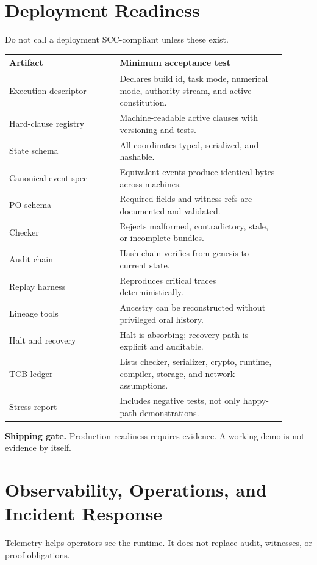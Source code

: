 \documentclass[11pt,oneside]{article}
\newenvironment{shipbox}{\begin{shaded}\noindent\textbf{Shipping gate.} }{\end{shaded}}
\begin{document}
\section{Deployment Readiness}
Do not call a deployment SCC-compliant unless these exist.

\begin{longtable}{@{}p{0.36\linewidth}p{0.54\linewidth}@{}}
\toprule
\textbf{Artifact} & \textbf{Minimum acceptance test} \\
\midrule
Execution descriptor & Declares build id, task mode, numerical mode, authority stream, and active constitution. \\
Hard-clause registry & Machine-readable active clauses with versioning and tests. \\
State schema & All coordinates typed, serialized, and hashable. \\
Canonical event spec & Equivalent events produce identical bytes across machines. \\
PO schema & Required fields and witness refs are documented and validated. \\
Checker & Rejects malformed, contradictory, stale, or incomplete bundles. \\
Audit chain & Hash chain verifies from genesis to current state. \\
Replay harness & Reproduces critical traces deterministically. \\
Lineage tools & Ancestry can be reconstructed without privileged oral history. \\
Halt and recovery & Halt is absorbing; recovery path is explicit and auditable. \\
TCB ledger & Lists checker, serializer, crypto, runtime, compiler, storage, and network assumptions. \\
Stress report & Includes negative tests, not only happy-path demonstrations. \\
\bottomrule
\end{longtable}

\begin{shipbox}
Production readiness requires evidence. A working demo is not evidence by itself.
\end{shipbox}



\section{Observability, Operations, and Incident Response}
Telemetry helps operators see the runtime. It does not replace audit, witnesses, or proof obligations.
\end{document}
